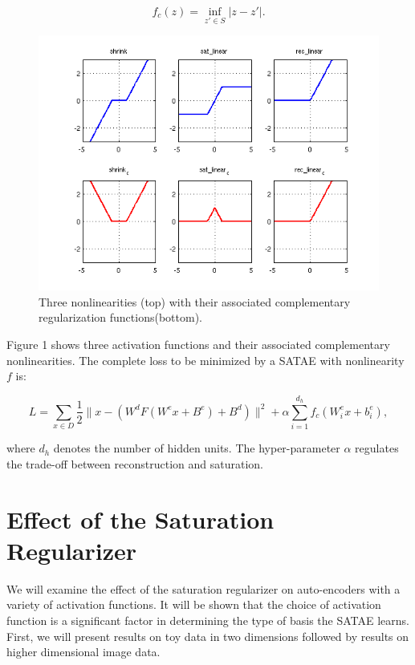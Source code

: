 \documentclass{article} %
\begin{document}
\begin{equation}
f_c(z) = \inf_ {z' \in S} |z-z'|.   
\end{equation}   

\begin{figure}
\centering 
\includegraphics[scale=0.6]{.//compliments.png}
\caption{Three nonlinearities (top) with their associated complementary regularization functions(bottom).}  
\label{fig:nonlin}
\end{figure} 

\noindent
Figure 1 shows three activation functions and their associated complementary nonlinearities. The complete loss to be minimized by a SATAE with nonlinearity $f$ is: 

\begin{equation} 
L = \sum_{x \in D} \frac{1}{2} \|x-\left(W^d F(W^e x+B^e)+B^d\right)\|^2 + \alpha \sum_{i=1}^{d_h}f_c(W^e_i x + b^e_i),
\end{equation}    

\noindent
where $d_h$ denotes the number of hidden units. The hyper-parameter $\alpha$ regulates the trade-off between reconstruction and saturation.  

\section{Effect of the Saturation Regularizer} 
We will examine the effect of the saturation regularizer on auto-encoders with a variety of activation functions. It will be shown that the choice of activation function is a significant factor in determining the type of basis the SATAE learns. First, we will present results on toy data in two dimensions followed by results on higher dimensional image data.
\end{document}
